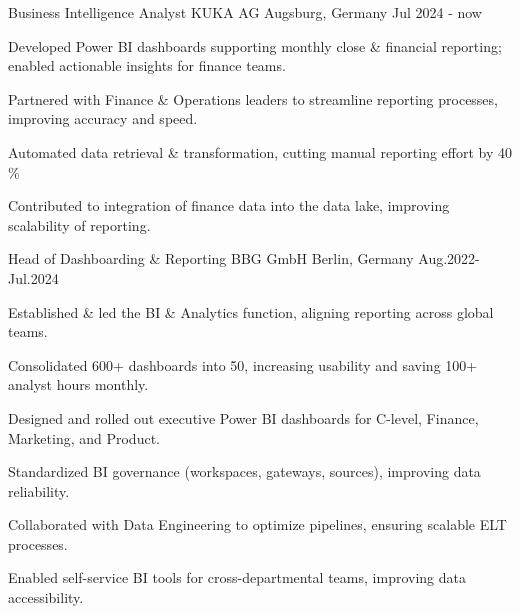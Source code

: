 


\begin{cventries}


\cventry
{Business Intelligence Analyst} %
{KUKA AG} %
{Augsburg, Germany} %
{Jul 2024 - now} %
{ %
    \begin{cvitems}
    \item {Developed Power BI dashboards supporting monthly close \& financial reporting; enabled actionable insights for finance teams.}
    \item {Partnered with Finance \& Operations leaders to streamline reporting processes, improving accuracy and speed.}
    \item {Automated data retrieval \& transformation, cutting manual reporting effort by 40 \% }
    \item {Contributed to integration of finance data into the data lake, improving scalability of reporting.}
    \end{cvitems}
}




\cventry
{Head of Dashboarding \& Reporting} %
{BBG GmbH} %
{Berlin, Germany} %
{Aug.2022-Jul.2024} %
{ %
\begin{cvitems}
\item {Established \& led the BI \& Analytics function, aligning reporting across global teams.}
\item {Consolidated 600+ dashboards into 50, increasing usability and saving 100+ analyst hours monthly.}
\item {Designed and rolled out executive Power BI dashboards for C-level, Finance, Marketing, and Product.}
\item {Standardized BI governance (workspaces, gateways, sources), improving data reliability.}
\item {Collaborated with Data Engineering to optimize pipelines, ensuring scalable ELT processes.}
\item {Enabled self-service BI tools for cross-departmental teams, improving data accessibility.}
\end{cvitems}
}


\end{cventries}
